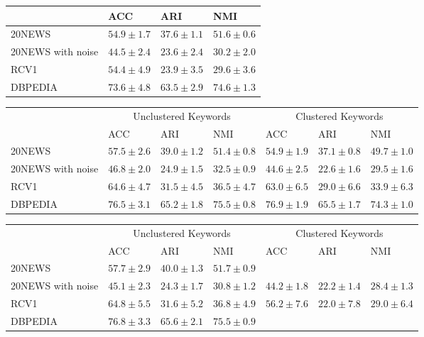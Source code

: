 \begin{table}[h]
\begin{tabular}{|l|l|l|l|}
  \end{tabular}
  \begin{tabular}{|l|l|l|l|}
    \hline
    & ACC          &ARI          & NMI          \\ \hline
    20NEWS     & $54.9\pm 1.7$&$37.6\pm 1.1$&$51.6\pm 0.6$ \\ \hline
    20NEWS with noise       & $44.5\pm 2.4$&$23.6\pm 2.4$&$30.2\pm 2.0$ \\ \hline
    RCV1       &$54.4\pm 4.9$ &$23.9\pm 3.5$&$29.6\pm 3.6$ \\ \hline
    DBPEDIA  &$73.6 \pm 4.8$& $63.5 \pm 2.9$& $74.6 \pm 1.3 $ \\ \hline
  \end{tabular}
  \begin{tabular}{|l|l|l|l||l|l|l|}
    \hline
    & \multicolumn{3}{c}{Unclustered Keywords} & \multicolumn{3}{c}{Clustered Keywords} \\
    & ACC          &ARI           & NMI  & ACC          &ARI           & NMI         \\ \hline
    20NEWS    &$57.5 \pm 2.6$&$39.0 \pm 1.2$&$51.4 \pm 0.8$ &$54.9 \pm 1.9$&$37.1 \pm 0.8$&$49.7 \pm 1.0$ \\ \hline
    20NEWS with noise      &$46.8\pm 2.0$  &$24.9\pm 1.5$&$32.5\pm 0.9$ &$44.6\pm 2.5$  &$22.6\pm 1.6$&$29.5\pm 1.6$ \\ \hline
    RCV1      &$64.6 \pm 4.7$&$31.5 \pm 4.5$&$36.5 \pm 4.7$ &$63.0 \pm 6.5$&$29.0 \pm 6.6$&$33.9 \pm 6.3$\\ \hline
    DBPEDIA  &$76.5 \pm 3.1$& $65.2 \pm 1.8$& $75.5 \pm 0.8 $ &$76.9 \pm 1.9$& $65.5 \pm 1.7$& $74.3 \pm 1.0 $\\ \hline
  \end{tabular}
  \begin{tabular}{|l|l|l|l||l|l|l|}
    \hline
    & \multicolumn{3}{c}{Unclustered Keywords} & \multicolumn{3}{c}{Clustered Keywords} \\
    & ACC                  &ARI                   & NMI& ACC                  &ARI                   & NMI                   \\ \hline
    20NEWS    &$57.7\pm 2.9$  &$40.0\pm 1.3$    &$51.7\pm 0.9$&&& \\ \hline
    20NEWS with noise      &$45.1\pm 2.3$  &$24.3\pm 1.7$&$30.8\pm 1.2$&$44.2\pm 1.8$  &$22.2\pm 1.4$&$28.4\pm 1.3$ \\ \hline
    RCV1      &$64.8\pm 5.5$&$31.6\pm 5.2$&$36.8 \pm 4.9$&$56.2\pm 7.6$&$22.0\pm 7.8$&$29.0 \pm 6.4$  \\ \hline
    DBPEDIA  &$76.8 \pm 3.3$& $65.6 \pm 2.1$& $75.5 \pm 0.9$&&& \\ \hline
\end{tabular}
\end{table}

